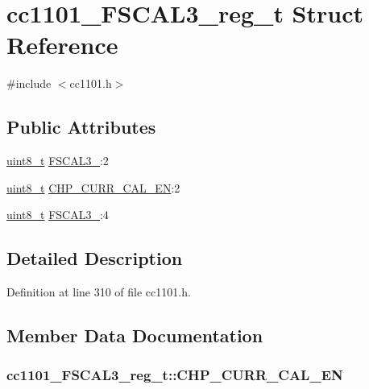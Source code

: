 \hypertarget{structcc1101___f_s_c_a_l3__reg__t}{}\section{cc1101\+\_\+\+F\+S\+C\+A\+L3\+\_\+reg\+\_\+t Struct Reference}
\label{structcc1101___f_s_c_a_l3__reg__t}


{\ttfamily \#include $<$cc1101.\+h$>$}

\subsection*{Public Attributes}
\begin{DoxyCompactItemize}
\item 
\hyperlink{_p_e___types_8h_aba7bc1797add20fe3efdf37ced1182c5}{uint8\+\_\+t} \hyperlink{structcc1101___f_s_c_a_l3__reg__t_ae1f17f678f2a671553decc429ce6b4ec}{F\+S\+C\+A\+L3\+\_}\+:2
\item 
\hyperlink{_p_e___types_8h_aba7bc1797add20fe3efdf37ced1182c5}{uint8\+\_\+t} \hyperlink{structcc1101___f_s_c_a_l3__reg__t_ae8a58122d888337d18c2e6af4b8f6736}{C\+H\+P\+\_\+\+C\+U\+R\+R\+\_\+\+C\+A\+L\+\_\+\+EN}\+:2
\item 
\hyperlink{_p_e___types_8h_aba7bc1797add20fe3efdf37ced1182c5}{uint8\+\_\+t} \hyperlink{structcc1101___f_s_c_a_l3__reg__t_ad61ab1323bf574a06772443074e4c522}{F\+S\+C\+A\+L3\+\_}\+:4
\end{DoxyCompactItemize}


\subsection{Detailed Description}


Definition at line 310 of file cc1101.\+h.



\subsection{Member Data Documentation}
\subsubsection[{\texorpdfstring{C\+H\+P\+\_\+\+C\+U\+R\+R\+\_\+\+C\+A\+L\+\_\+\+EN}{CHP_CURR_CAL_EN}}]{ cc1101\+\_\+\+F\+S\+C\+A\+L3\+\_\+reg\+\_\+t\+::\+C\+H\+P\+\_\+\+C\+U\+R\+R\+\_\+\+C\+A\+L\+\_\+\+EN}\hypertarget{structcc1101___f_s_c_a_l3__reg__t_ae8a58122d888337d18c2e6af4b8f6736}{}\label{structcc1101___f_s_c_a_l3__reg__t_ae8a58122d888337d18c2e6af4b8f6736}


